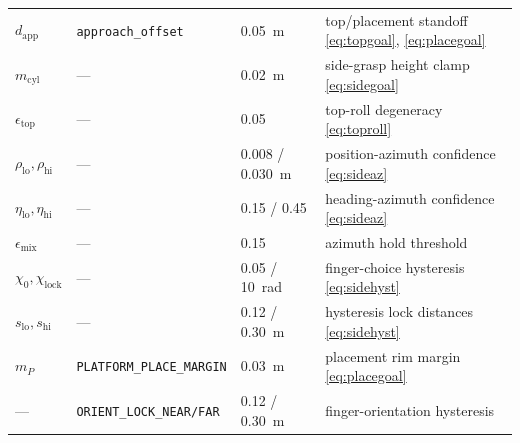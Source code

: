 \begin{tabularx}{\linewidth}{@{}l>{\scriptsize}ll>{\raggedright\arraybackslash}X@{}}
$d_{\text{app}}$ & \texttt{approach\_offset} & 0.05~m & top/placement standoff \eqref{eq:topgoal}, \eqref{eq:placegoal} \\
$m_{\text{cyl}}$ & --- & 0.02~m & side-grasp height clamp \eqref{eq:sidegoal} \\
$\epsilon_{\text{top}}$ & --- & 0.05 & top-roll degeneracy \eqref{eq:toproll} \\
$\rho_{\text{lo}}, \rho_{\text{hi}}$ & --- & 0.008 / 0.030~m & position-azimuth confidence \eqref{eq:sideaz} \\
$\eta_{\text{lo}}, \eta_{\text{hi}}$ & --- & 0.15 / 0.45 & heading-azimuth confidence \eqref{eq:sideaz} \\
$\epsilon_{\text{mix}}$ & --- & 0.15 & azimuth hold threshold \\
$\chi_0, \chi_{\text{lock}}$ & --- & 0.05 / 10~rad & finger-choice hysteresis \eqref{eq:sidehyst} \\
$s_{\text{lo}}, s_{\text{hi}}$ & --- & 0.12 / 0.30~m & hysteresis lock distances \eqref{eq:sidehyst} \\
$m_P$ & \texttt{PLATFORM\_PLACE\_MARGIN} & 0.03~m & placement rim margin \eqref{eq:placegoal} \\
--- & \texttt{ORIENT\_LOCK\_NEAR/FAR} & 0.12 / 0.30~m & finger-orientation hysteresis \\
\bottomrule
\end{tabularx}

